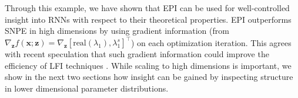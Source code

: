 \documentclass[11pt]{article}
\begin{document}
Through this example, we have shown that EPI can be used for well-controlled insight into RNNs with respect to their theoretical properties.
EPI outperforms SNPE in high dimensions by using gradient information (from $\nabla_\mathbf{z} f(\mathbf{x}; \mathbf{z}) = \nabla_\mathbf{z} [\text{real}(\lambda_1), \lambda_1^s]^\top$) on each optimization iteration.
This agrees with recent speculation that such gradient information could improve the efficiency of LFI techniques \cite{cranmer2020frontier}.
While scaling to high dimensions is important, we show in the next two sections how insight can be gained by inspecting structure in lower dimensional parameter distributions.

%
\end{document}
